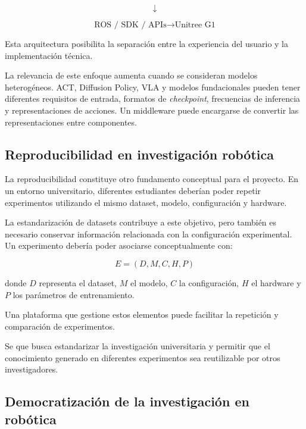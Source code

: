 \documentclass[stu,12pt,floatsintext]{apa7}
\begin{document}
\begin{equation}
\downarrow
\end{equation}

\begin{equation}
\text{ROS / SDK / APIs}
\rightarrow
\text{Unitree G1}
\end{equation}

Esta arquitectura posibilita la separación entre la experiencia del usuario y la implementación técnica.

La relevancia de este enfoque aumenta cuando se consideran modelos heterogéneos. ACT, Diffusion Policy, VLA y modelos fundacionales pueden tener diferentes requisitos de entrada, formatos de \textit{checkpoint}, frecuencias de inferencia y representaciones de acciones. Un middleware puede encargarse de convertir las representaciones entre componentes.

\subsection{Reproducibilidad en investigación robótica}

La reproducibilidad constituye otro fundamento conceptual para el proyecto. En un entorno universitario, diferentes estudiantes deberían poder repetir experimentos utilizando el mismo dataset, modelo, configuración y hardware.

La estandarización de datasets contribuye a este objetivo, pero también es necesario conservar información relacionada con la configuración experimental. Un experimento debería poder asociarse conceptualmente con:

\begin{equation}
E = (D,M,C,H,P)
\end{equation}

donde $D$ representa el dataset, $M$ el modelo, $C$ la configuración, $H$ el hardware y $P$ los parámetros de entrenamiento.

Una plataforma que gestione estos elementos puede facilitar la repetición y comparación de experimentos.

Se que busca estandarizar la investigación universitaria y permitir que el conocimiento generado en diferentes experimentos sea reutilizable por otros investigadores.

\subsection{Democratización de la investigación en robótica}
\end{document}
